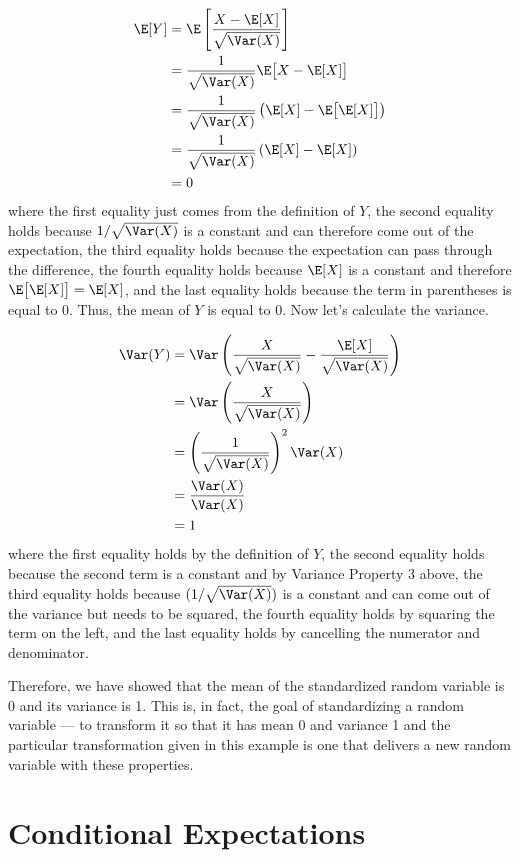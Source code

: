 \documentclass[
  letterpaper,
  DIV=11,
  numbers=noendperiod]{scrreprt}
\begin{document}
\[
  \begin{aligned}
    \E[Y] &= \E\left[ \frac{X - \E[X]}{\sqrt{\Var(X)}} \right] \\
    &= \frac{1}{\sqrt{\Var(X)}} \E\big[ X - \E[X] \big] \\
    &= \frac{1}{\sqrt{\Var(X)}} \left( \E[X] - \E\big[\E[X]\big] \right) \\
    &= \frac{1}{\sqrt{\Var(X)}} \left( \E[X] - \E[X] \right) \\
    &= 0
  \end{aligned}
\] where the first equality just comes from the definition of \(Y\), the
second equality holds because \(1/\sqrt{\Var(X)}\) is a constant and can
therefore come out of the expectation, the third equality holds because
the expectation can pass through the difference, the fourth equality
holds because \(\E[X]\) is a constant and therefore
\(\E\big[\E[X]\big] = \E[X]\), and the last equality holds because the
term in parentheses is equal to 0. Thus, the mean of \(Y\) is equal to
0. Now let's calculate the variance.

\[
  \begin{aligned}
  \Var(Y) &= \Var\left( \frac{X}{\sqrt{\Var(X)}} - \frac{\E[X]}{\sqrt{\Var(X)}} \right) \\
  &= \Var\left( \frac{X}{\sqrt{\Var(X)}}\right) \\
  &= \left( \frac{1}{\sqrt{\Var(X)}} \right)^2 \Var(X) \\
  &= \frac{\Var(X)}{\Var(X)} \\
  &= 1
  \end{aligned}
\] where the first equality holds by the definition of \(Y\), the second
equality holds because the second term is a constant and by Variance
Property 3 above, the third equality holds because
\((1/\sqrt{\Var(X)})\) is a constant and can come out of the variance
but needs to be squared, the fourth equality holds by squaring the term
on the left, and the last equality holds by cancelling the numerator and
denominator.

Therefore, we have showed that the mean of the standardized random
variable is 0 and its variance is 1. This is, in fact, the goal of
standardizing a random variable --- to transform it so that it has mean
0 and variance 1 and the particular transformation given in this example
is one that delivers a new random variable with these properties.

\section{Conditional Expectations}\label{conditional-expectations}
\end{document}

